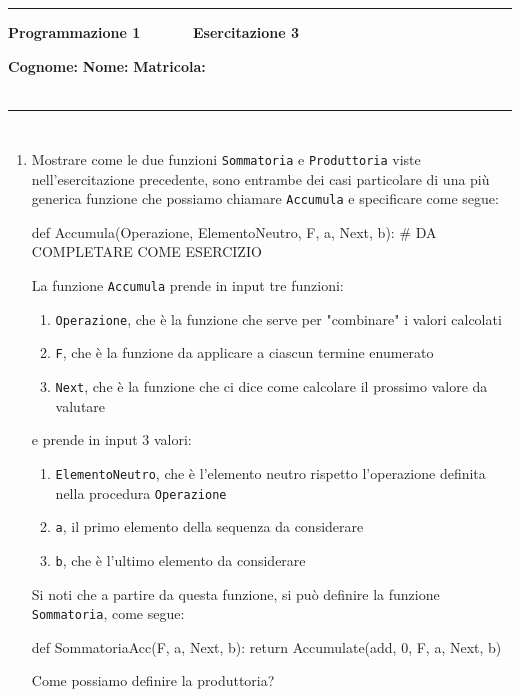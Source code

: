 \documentclass[11pt,a4]{article}
\begin{document}
\thispagestyle{empty}
\hrule
\begin{center}
   {\Large {\bf Programmazione 1 \hspace{3cm} $\quad \quad \quad$ Esercitazione 3}}
\end{center}
{\bf Cognome: }\hspace{2.5cm} {\bf Nome: } \hspace{2.5cm} {\bf Matricola: } \\\
\hrule

\section*{}
\begin{enumerate}

\item Mostrare come le due funzioni {\tt Sommatoria} e {\tt Produttoria} viste nell'esercitazione precedente, sono
entrambe dei casi particolare di una più generica funzione che possiamo chiamare {\tt Accumula} e specificare come segue:
\begin{python}
def Accumula(Operazione, ElementoNeutro, F, a, Next, b):
    # DA COMPLETARE COME ESERCIZIO
\end{python}
La funzione {\tt Accumula} prende in input tre funzioni:
\begin{enumerate}
\item {\tt Operazione}, che è la funzione che serve per "combinare" i valori calcolati
\item {\tt F}, che è la funzione da applicare a ciascun termine enumerato
\item {\tt Next}, che è la funzione che ci dice come calcolare il prossimo valore da valutare
\end{enumerate}		
		e prende in input 3 valori:
\begin{enumerate}
\item {\tt ElementoNeutro}, che è l'elemento neutro rispetto l'operazione definita nella procedura {\tt Operazione}
\item {\tt a}, il primo elemento della sequenza da considerare
\item {\tt b}, che è l'ultimo elemento da considerare 
\end{enumerate}

Si noti che a partire da questa funzione, si può definire la funzione {\tt Sommatoria}, come segue:
\begin{python}
def SommatoriaAcc(F, a, Next, b):
    return Accumulate(add, 0, F, a, Next, b)
\end{python}
Come possiamo definire la produttoria?


\end{enumerate}
\end{document}
